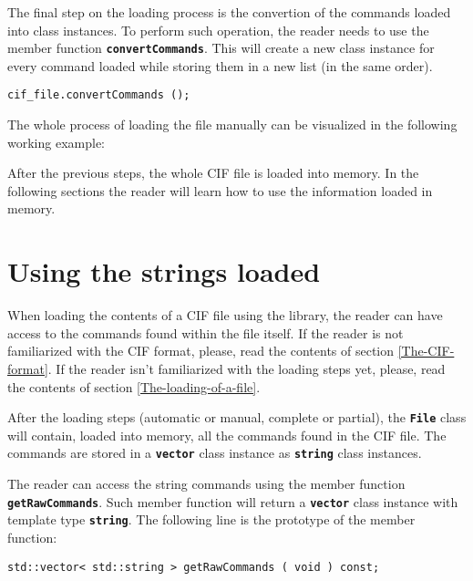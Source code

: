\documentclass[11pt,twoside,openany,x11names,svgnames]{memoir}
\begin{document}
The final step on the loading process is the convertion of the commands loaded into class instances. To perform such operation, the reader needs to use the member function \textbf{\texttt{convertCommands}}. This will create a new class instance for every command loaded while storing them in a new list (in the same order).

\begin{lstlisting}[frame=single,style=CPPStyle]
cif_file.convertCommands ();
\end{lstlisting}

The whole process of loading the file manually can be visualized in the following working example:



After the previous steps, the whole CIF file is loaded into memory. In the following sections the reader will learn how to use the information loaded in memory.

\section{Using the strings loaded}\label{Using-the-strings-loaded}

When loading the contents of a CIF file using the library, the reader can have access to the commands found within the file itself. If the reader is not familiarized with the CIF format, please, read the contents of section \ref{The-CIF-format}. If the reader isn't familiarized with the loading steps yet, please, read the contents of section \ref{The-loading-of-a-file}.

After the loading steps (automatic or manual, complete or partial), the \textbf{\texttt{File}} class will contain, loaded into memory, all the commands found in the CIF file. The commands are stored in a \textbf{\texttt{vector}} class instance as \textbf{\texttt{string}} class instances.

The reader can access the string commands using the member function \textbf{\texttt{getRawCommands}}. Such member function will return a \textbf{\texttt{vector}} class instance with template type \textbf{\texttt{string}}. The following line is the prototype of the member function:

\begin{lstlisting}[frame=single,style=CPPStyle]
std::vector< std::string > getRawCommands ( void ) const;
\end{lstlisting}
\end{document}
